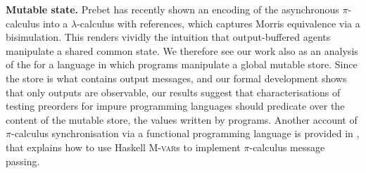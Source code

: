   
  {\bfseries Mutable state.}
  Prebet \cite{DBLP:conf/icalp/Prebet22} has recently shown an 
  encoding of the asynchronous $\pi$-calculus into a $\lambda$-calculus
  with references, which captures Morris equivalence via a bisimulation.
  This renders vividly the intuition that output-buffered agents
  manipulate a shared common state.
  We therefore see our work also as an analysis of the \mustpreorder for
  a language in which programs manipulate a global mutable store.
  Since the store is what contains output messages, and our formal
  development shows that only outputs are observable, our results
  suggest that characterisations of testing preorders for impure
  programming languages should predicate over the content of the mutable
  store, \ie the values written by programs.
  Another account of $\pi$-calculus synchronisation via a
    functional programming language is provided in
    \cite{DBLP:journals/corr/abs-2008-13359}, that explains how to
    use Haskell \textsc{M-var}s to implement $\pi$-calculus
    message passing.








